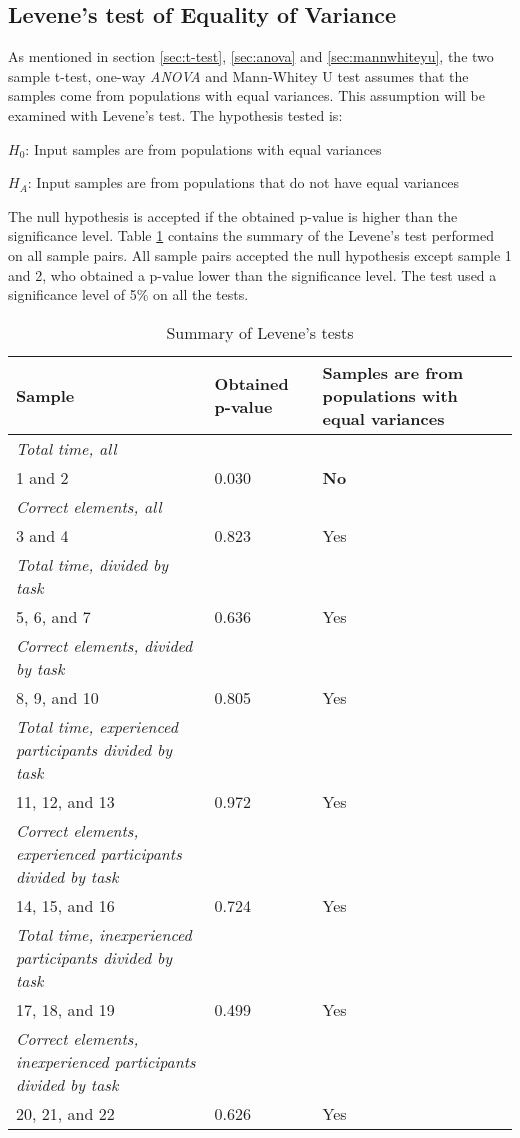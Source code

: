 \vspace{0.7cm}

\subsection{Levene's test of Equality of Variance}\label{sec:levene_test_results}
As mentioned in section \ref{sec:t-test}, \ref{sec:anova} and \ref{sec:mannwhiteyu}, the two sample t-test, one-way \textit{ANOVA} and Mann-Whitey U test assumes that the samples come from populations with equal variances. This assumption will be examined with Levene's test. The hypothesis tested is: \\[0.3cm]

\centerline{$H_{0}$: Input samples are from populations with equal variances} 
\centerline{$H_{A}$: Input samples are from populations that do not have equal variances}
\vspace{0.3cm}

The null hypothesis is accepted if the obtained p-value is higher than the significance level. Table \ref{tab:levenestest_summary} contains the summary of the Levene's test performed on all sample pairs. All sample pairs accepted the null hypothesis except sample 1 and 2, who obtained a p-value lower than the significance level. The test used a significance level of 5\% on all the tests. \\[0.2cm]

\begin{longtable}{p{}|l|p{}}
	\caption[Summary, Levene's tests]{Summary of Levene's tests} \label{tab:levenestest_summary} \\
	Sample & Obtained p-value & Samples are from populations with equal variances \\ \hline
	\textit{Total time, all} & & \\
	1 and 2 & 0.030 & \textbf{No}  \\ \hline
	\textit{Correct elements, all} & & \\
	3 and 4 &0.823& Yes   \\ \hline
	\textit{Total time, divided by task}& & \\
	5, 6, and 7 & 0.636 & Yes \\ \hline
	\textit{Correct elements, divided by task} & & \\
	8, 9, and 10 & 0.805  & Yes  \\ \hline
	\textit{Total time, experienced participants divided by task} & & \\
	11, 12, and 13 & 0.972 & Yes  \\ \hline
	\textit{Correct elements, experienced participants divided by task} & & \\
	14, 15, and 16 & 0.724 & Yes \\ \hline
	\textit{Total time, inexperienced participants divided by task} & & \\
	17, 18, and 19 & 0.499  & Yes  \\ \hline
	\textit{Correct elements, inexperienced participants divided by task} & & \\
	20, 21, and 22 & 0.626 & Yes \\ \hline
\end{longtable}

